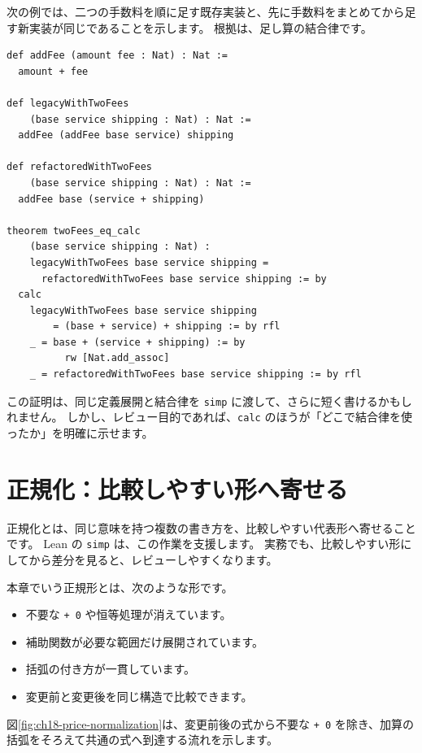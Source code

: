 次の例では、二つの手数料を順に足す既存実装と、先に手数料をまとめてから足す新実装が同じであることを示します。
根拠は、足し算の結合律です。

\begin{listing}[htbp]
\begin{verbatim}
def addFee (amount fee : Nat) : Nat :=
  amount + fee

def legacyWithTwoFees
    (base service shipping : Nat) : Nat :=
  addFee (addFee base service) shipping

def refactoredWithTwoFees
    (base service shipping : Nat) : Nat :=
  addFee base (service + shipping)

theorem twoFees_eq_calc
    (base service shipping : Nat) :
    legacyWithTwoFees base service shipping =
      refactoredWithTwoFees base service shipping := by
  calc
    legacyWithTwoFees base service shipping
        = (base + service) + shipping := by rfl
    _ = base + (service + shipping) := by
          rw [Nat.add_assoc]
    _ = refactoredWithTwoFees base service shipping := by rfl
\end{verbatim}
\caption{\texttt{twoFees\_eq\_calc}}
\label{lst:ch18-calc}
\end{listing}

この証明は、同じ定義展開と結合律を \texttt{simp} に渡して、さらに短く書けるかもしれません。
しかし、レビュー目的であれば、\texttt{calc} のほうが「どこで結合律を使ったか」を明確に示せます。

\section{正規化：比較しやすい形へ寄せる}

正規化とは、同じ意味を持つ複数の書き方を、比較しやすい代表形へ寄せることです。
Lean の \texttt{simp} は、この作業を支援します。
実務でも、比較しやすい形にしてから差分を見ると、レビューしやすくなります。

本章でいう正規形とは、次のような形です。
\begin{itemize}
\item 不要な \texttt{+ 0} や恒等処理が消えています。
\item 補助関数が必要な範囲だけ展開されています。
\item 括弧の付き方が一貫しています。
\item 変更前と変更後を同じ構造で比較できます。
\end{itemize}

図\ref{fig:ch18-price-normalization}は、変更前後の式から不要な \texttt{+ 0} を除き、加算の括弧をそろえて共通の式へ到達する流れを示します。

